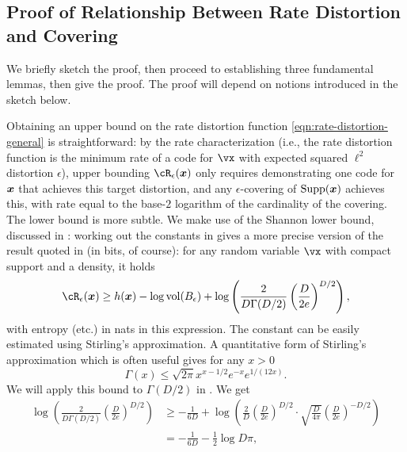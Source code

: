 \documentclass[../../book-main.tex]{subfiles}
\begin{document}
\subsection{Proof of Relationship Between Rate Distortion and Covering}

We briefly sketch the proof, then proceed to establishing three fundamental
lemmas, then give the proof. The proof will depend on notions introduced in the
sketch below.

Obtaining an upper bound on the rate distortion function
\eqref{eqn:rate-distortion-general} is straightforward: by the rate
characterization (i.e., the rate distortion function is the minimum rate of
a code for $\vx$ with expected squared $\ell^2$ distortion $\epsilon$), upper
bounding $\cR_{\epsilon}(\x)$ only requires demonstrating one code for $\bm{x}$ that
achieves this target distortion, and any $\epsilon$-covering of $\operatorname{Supp}(\bm{x})$
achieves this, with rate equal to the base-$2$ logarithm of the cardinality of
the covering.
The lower bound is more subtle. We make use of the Shannon lower bound,
discussed in : working out the constants in \cite[\S III,
(22)]{Linder1994-ej} gives a more precise version of the result quoted in
 (in bits, of course): for any random variable $\vx$ with compact
support and a density, it holds
\begin{equation}\label{eq:slb-appendix-1}
    \cR_{\epsilon}(\x)
    \geq
    h(\x)
    - \log \volume(B_{\epsilon})
    +
    \log
    \left(
    \frac{
    	2
    }
    {
    	D \Gamma(D/2)
    }
    \left(
    \frac{
    	D
    }
    {
    	2e
    }
    \right)^{D/2}
    \right),
\end{equation}
with entropy (etc.) in nats in this expression.
The constant can be easily estimated using Stirling's approximation.
A quantitative form of Stirling's approximation which is often useful gives
for any $x > 0$ \cite{Jameson2015-hy}
\begin{equation}
    \Gamma(x) \leq \sqrt{2\pi} x^{x - 1/2} e^{-x} e^{1/(12x)}.
\end{equation}
We will apply this bound to $\Gamma(D/2)$ in .
We get
\begin{align}
    \log
    \left(
    \frac{
        2
    }
    {
        D \Gamma(D/2)
    }
    \left(
    \frac{
        D
    }
    {
        2e
    }
    \right)^{D/2}
    \right)
    &\geq
    -\frac{1}{6D}
    +
    \log\left(
        \frac{2}{D} 
        \left(
        \frac{
            D
        }
        {
            2e
        }
        \right)^{D/2}
        \cdot
        \sqrt{\frac{D}{4\pi}}
        \left(
        \frac{D}{2e}
        \right)^{-D/2}
    \right)
    \\
    &=
    -\frac{1}{6D}
    - \frac{1}{2}\log D\pi,\label{eq:slb-constant-est}
\end{align}
\end{document}
